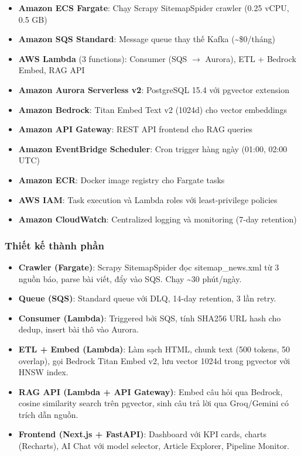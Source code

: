\begin{itemize}
\tightlist
\item
  \textbf{Amazon ECS Fargate}: Chạy Scrapy SitemapSpider crawler (0.25
  vCPU, 0.5 GB)
\item
  \textbf{Amazon SQS Standard}: Message queue thay thế Kafka
  (\textasciitilde\$0/tháng)
\item
  \textbf{AWS Lambda} (3 functions): Consumer (SQS \(\rightarrow\)
  Aurora), ETL + Bedrock Embed, RAG API
\item
  \textbf{Amazon Aurora Serverless v2}: PostgreSQL 15.4 với pgvector
  extension
\item
  \textbf{Amazon Bedrock}: Titan Embed Text v2 (1024d) cho vector
  embeddings
\item
  \textbf{Amazon API Gateway}: REST API frontend cho RAG queries
\item
  \textbf{Amazon EventBridge Scheduler}: Cron trigger hàng ngày (01:00,
  02:00 UTC)
\item
  \textbf{Amazon ECR}: Docker image registry cho Fargate tasks
\item
  \textbf{AWS IAM}: Task execution và Lambda roles với least-privilege
  policies
\item
  \textbf{Amazon CloudWatch}: Centralized logging và monitoring (7-day
  retention)
\end{itemize}

\hypertarget{thiux1ebft-kux1ebf-thuxe0nh-phux1ea7n}{%
\subsubsection{Thiết kế thành
phần}}

\begin{itemize}
\tightlist
\item
  \textbf{Crawler (Fargate)}: Scrapy SitemapSpider đọc sitemap\_news.xml
  từ 3 nguồn báo, parse bài viết, đẩy vào SQS. Chạy \textasciitilde30
  phút/ngày.
\item
  \textbf{Queue (SQS)}: Standard queue với DLQ, 14-day retention, 3 lần
  retry.
\item
  \textbf{Consumer (Lambda)}: Triggered bởi SQS, tính SHA256 URL hash
  cho dedup, insert bài thô vào Aurora.
\item
  \textbf{ETL + Embed (Lambda)}: Làm sạch HTML, chunk text (500 tokens,
  50 overlap), gọi Bedrock Titan Embed v2, lưu vector 1024d trong
  pgvector với HNSW index.
\item
  \textbf{RAG API (Lambda + API Gateway)}: Embed câu hỏi qua Bedrock,
  cosine similarity search trên pgvector, sinh câu trả lời qua
  Groq/Gemini có trích dẫn nguồn.
\item
  \textbf{Frontend (Next.js + FastAPI)}: Dashboard với KPI cards, charts
  (Recharts), AI Chat với model selector, Article Explorer, Pipeline
  Monitor.
\end{itemize}

